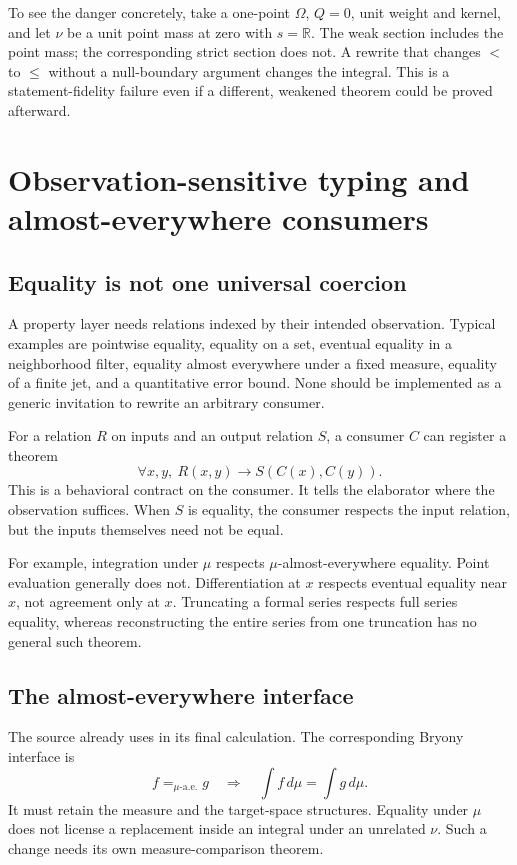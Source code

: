 \documentclass[11pt,a4paper]{article}
\newcommand{\code}[1]{\texttt{\detokenize{#1}}}
\newcommand{\R}{\mathbb R}\newcommand{\Q}{\mathbb Q}\newcommand{\Z}{\mathbb Z}\newcommand{\N}{\mathbb N}
\newcommand{\almostevery}{\mathrm{a.e.}}\newcommand{\Bool}{\mathsf{Bool}}
\theoremstyle{definition}\newtheorem{definition}[theorem]{Definition}
\theoremstyle{remark}\newtheorem{remark}[theorem]{Remark}
\begin{document}
To see the danger concretely, take a one-point $\Omega$, $Q=0$, unit weight and kernel, and let $\nu$ be a unit point mass at zero with $s=\R$. The weak section includes the point mass; the corresponding strict section does not. A rewrite that changes $<$ to $\le$ without a null-boundary argument changes the integral. This is a statement-fidelity failure even if a different, weakened theorem could be proved afterward.

\section{Observation-sensitive typing and almost-everywhere consumers}\label{sec:observations}

\subsection{Equality is not one universal coercion}
A property layer needs relations indexed by their intended observation. Typical examples are pointwise equality, equality on a set, eventual equality in a neighborhood filter, equality almost everywhere under a fixed measure, equality of a finite jet, and a quantitative error bound. None should be implemented as a generic invitation to rewrite an arbitrary consumer.

For a relation $R$ on inputs and an output relation $S$, a consumer $C$ can register a theorem
\begin{equation}\label{eq:consumer}
 \forall x,y,\ R(x,y)\to S(C(x),C(y)).
\end{equation}
This is a behavioral contract on the consumer. It tells the elaborator where the observation suffices. When $S$ is equality, the consumer respects the input relation, but the inputs themselves need not be equal.

For example, integration under $\mu$ respects $\mu$-almost-everywhere equality. Point evaluation generally does not. Differentiation at $x$ respects eventual equality near $x$, not agreement only at $x$. Truncating a formal series respects full series equality, whereas reconstructing the entire series from one truncation has no general such theorem.

\subsection{The almost-everywhere interface}
The source already uses \code{integral_congr_ae} in its final calculation. The corresponding Bryony interface is
\[
 f=_{\mu\text{-}\almostevery}g
 \quad\Longrightarrow\quad
 \int f\,d\mu=\int g\,d\mu.
\]
It must retain the measure and the target-space structures. Equality under $\mu$ does not license a replacement inside an integral under an unrelated $\nu$. Such a change needs its own measure-comparison theorem.
\end{document}
